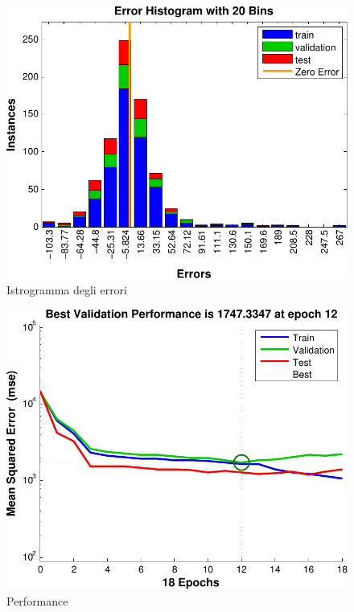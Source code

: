 \begin{figure}[htbp]
  \centering
  \includegraphics[scale=0.5]{images/timeseries/energia/histogram.pdf}
  \caption{Istrogramma degli errori}
\end{figure}

\begin{figure}[htbp]
  \centering
  \includegraphics[scale=0.5]{images/timeseries/energia/performances.pdf}
  \caption{Performance}
\end{figure}

